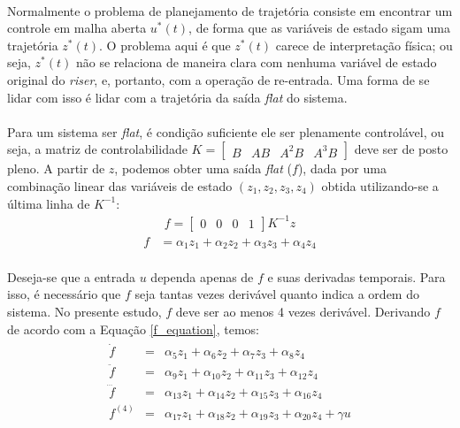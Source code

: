 \documentclass[a4paper,11pt]{scrartcl} %
\numberwithin{equation}{section} %
\numberwithin{figure}{section} %
\numberwithin{table}{section} %
\begin{document}
\paragraph{} Normalmente o problema de planejamento de trajetória consiste em encontrar um controle em malha aberta $u^*(t)$, de forma que as variáveis de estado sigam uma trajetória $z^*(t)$. O problema aqui é que $z^*(t)$ carece de interpretação física; ou seja, $z^*(t)$ não se relaciona de maneira clara com nenhuma variável de estado original do \textit{riser}, e, portanto, com a operação de re-entrada. Uma forma de se lidar com isso é lidar com a trajetória da saída \textit{flat} do sistema. %

\paragraph{} Para um sistema ser \textit{flat}, é condição suficiente ele ser plenamente controlável, ou seja, a matriz de controlabilidade $K = \left[
\begin{array}{cccc}
B & AB & A^{2}B & A^{3}B
\end{array} \right ]$ deve ser de posto pleno. A partir de $z$, podemos obter uma saída \textit{flat} ($f$), dada por uma combinação linear das variáveis de estado $\left (z_1, z_2, z_3, z_4 \right )$ obtida utilizando-se a última linha de $K^{-1}$:
\begin{align}
	f = \left[\begin{array}{cccc}
	0 & 0 & 0 & 1
	\end{array}\right]K^{-1}z
\end{align} %
\begin{align}
\label{f_equation}
	f &= \alpha_1 z_1 + \alpha_2 z_2 + \alpha_3 z_3 + \alpha_4 z_4
\end{align}
\paragraph{}Deseja-se que a entrada $u$ dependa apenas de $f$ e suas derivadas temporais. Para isso, é necessário que $f$ seja tantas vezes derivável quanto indica a ordem do sistema. No presente estudo, $f$ deve ser ao menos 4 vezes derivável. Derivando $f$ de acordo com a Equação \ref{f_equation}, temos:
\begin{align}
	\label{f_derivatives}
	\begin{array}{lcl}
	\dot{f} &=& \alpha_5 z_1 + \alpha_6 z_2 + \alpha_7 z_3 + \alpha_8 z_4 \\
	\ddot{f} &=& \alpha_9 z_1 + \alpha_{10} z_2 + \alpha_{11} z_3 + \alpha_{12} z_4 \\
	\dddot{f} &=& \alpha_{13} z_1 + \alpha_{14} z_2 + \alpha_{15} z_3 + \alpha_{16} z_4 \\
	f^{(4)} &=& \alpha_{17} z_1 + \alpha_{18} z_2 + \alpha_{19} z_3 + \alpha_{20} z_4 + \gamma u
	\end{array}
\end{align} %
\end{document}
